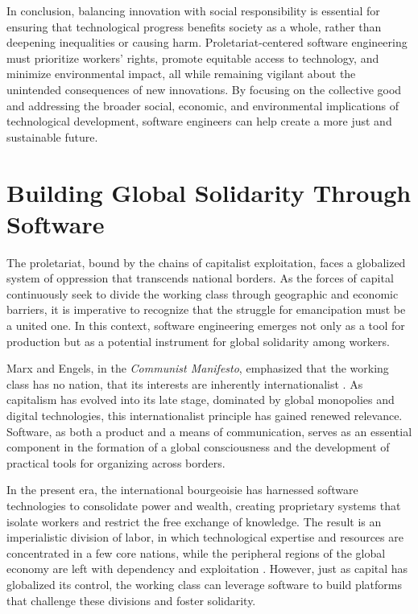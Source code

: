 \begin{refsection}
In conclusion, balancing innovation with social responsibility is essential for ensuring that technological progress benefits society as a whole, rather than deepening inequalities or causing harm. Proletariat-centered software engineering must prioritize workers' rights, promote equitable access to technology, and minimize environmental impact, all while remaining vigilant about the unintended consequences of new innovations. By focusing on the collective good and addressing the broader social, economic, and environmental implications of technological development, software engineers can help create a more just and sustainable future.

\section{Building Global Solidarity Through Software}

The proletariat, bound by the chains of capitalist exploitation, faces a globalized system of oppression that transcends national borders. As the forces of capital continuously seek to divide the working class through geographic and economic barriers, it is imperative to recognize that the struggle for emancipation must be a united one. In this context, software engineering emerges not only as a tool for production but as a potential instrument for global solidarity among workers.

Marx and Engels, in the \textit{Communist Manifesto}, emphasized that the working class has no nation, that its interests are inherently internationalist \cite[pp.~81-83]{marxmanifesto}. As capitalism has evolved into its late stage, dominated by global monopolies and digital technologies, this internationalist principle has gained renewed relevance. Software, as both a product and a means of communication, serves as an essential component in the formation of a global consciousness and the development of practical tools for organizing across borders.

In the present era, the international bourgeoisie has harnessed software technologies to consolidate power and wealth, creating proprietary systems that isolate workers and restrict the free exchange of knowledge. The result is an imperialistic division of labor, in which technological expertise and resources are concentrated in a few core nations, while the peripheral regions of the global economy are left with dependency and exploitation \cite[pp.~150-153]{aminimperialism}. However, just as capital has globalized its control, the working class can leverage software to build platforms that challenge these divisions and foster solidarity. 


\end{refsection}
